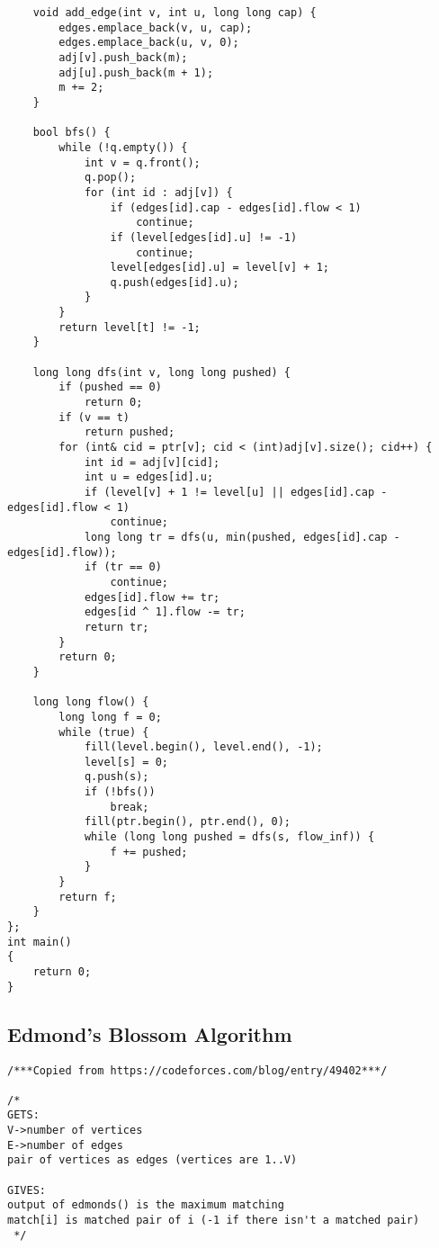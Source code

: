 \documentclass{article}
\begin{document}
\begin{multicols}{3}[]
\begin{verbatim}
    void add_edge(int v, int u, long long cap) {
        edges.emplace_back(v, u, cap);
        edges.emplace_back(u, v, 0);
        adj[v].push_back(m);
        adj[u].push_back(m + 1);
        m += 2;
    }

    bool bfs() {
        while (!q.empty()) {
            int v = q.front();
            q.pop();
            for (int id : adj[v]) {
                if (edges[id].cap - edges[id].flow < 1)
                    continue;
                if (level[edges[id].u] != -1)
                    continue;
                level[edges[id].u] = level[v] + 1;
                q.push(edges[id].u);
            }
        }
        return level[t] != -1;
    }

    long long dfs(int v, long long pushed) {
        if (pushed == 0)
            return 0;
        if (v == t)
            return pushed;
        for (int& cid = ptr[v]; cid < (int)adj[v].size(); cid++) {
            int id = adj[v][cid];
            int u = edges[id].u;
            if (level[v] + 1 != level[u] || edges[id].cap - edges[id].flow < 1)
                continue;
            long long tr = dfs(u, min(pushed, edges[id].cap - edges[id].flow));
            if (tr == 0)
                continue;
            edges[id].flow += tr;
            edges[id ^ 1].flow -= tr;
            return tr;
        }
        return 0;
    }

    long long flow() {
        long long f = 0;
        while (true) {
            fill(level.begin(), level.end(), -1);
            level[s] = 0;
            q.push(s);
            if (!bfs())
                break;
            fill(ptr.begin(), ptr.end(), 0);
            while (long long pushed = dfs(s, flow_inf)) {
                f += pushed;
            }
        }
        return f;
    }
};
int main()
{
    return 0;
}

\end{verbatim}


\subsection{Edmond's Blossom Algorithm}

\begin{verbatim}
/***Copied from https://codeforces.com/blog/entry/49402***/

/*
GETS:
V->number of vertices
E->number of edges
pair of vertices as edges (vertices are 1..V)

GIVES:
output of edmonds() is the maximum matching
match[i] is matched pair of i (-1 if there isn't a matched pair)
 */


\end{verbatim}
\end{multicols}
\end{document}
